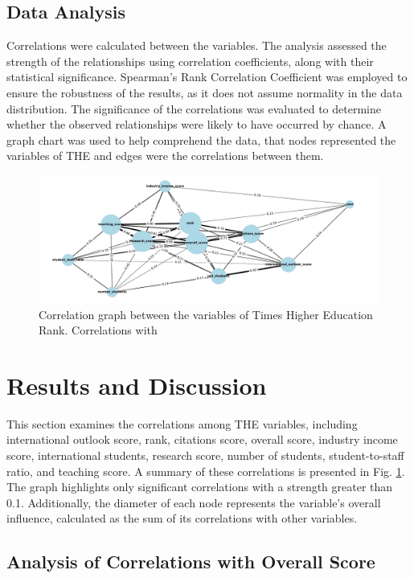 \documentclass[sigconf]{acmart}
\begin{document}
\subsection{Data Analysis}

Correlations were calculated between the variables. The analysis assessed the strength of the relationships using correlation coefficients, along with their statistical significance. Spearman's Rank Correlation Coefficient \cite{spearman1904general} was employed to ensure the robustness of the results, as it does not assume normality in the data distribution. The significance of the correlations was evaluated to determine whether the observed relationships were likely to have occurred by chance. A graph chart was used to help comprehend the data, that nodes represented the variables of THE and edges were the correlations between them. 

\begin{figure}[t]
	\centering
	\includegraphics[width=\linewidth]{figures/correlation_graph.pdf}
	\caption{Correlation graph between the variables of Times Higher Education Rank. Correlations with }
	\label{fig:graf_citation}
\end{figure}

\section{Results and Discussion}
This section examines the correlations among THE variables, including international outlook score, rank, citations score, overall score, industry income score, international students, research score, number of students, student-to-staff ratio, and teaching score. A summary of these correlations is presented in Fig. \ref{fig:graf_citation}. The graph highlights only significant correlations with a strength greater than 0.1. Additionally, the diameter of each node represents the variable's overall influence, calculated as the sum of its correlations with other variables.


\subsection{Analysis of Correlations with Overall Score}
\end{document}
